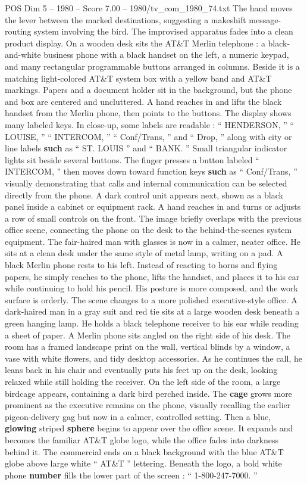 \begin{textsample}{POS Dim 5 – 1980 – Score 7.00 – 1980/tv\_com\_1980\_74.txt}
The hand moves the lever between the marked destinations, suggesting a makeshift message-routing system involving the bird.
The improvised apparatus fades into a clean product display.
On a wooden desk sits the AT\&T Merlin telephone : a black-and-white business phone with a black handset on the left, a numeric keypad, and many rectangular programmable buttons arranged in columns.
Beside it is a matching light-colored AT\&T system box with a yellow band and AT\&T markings.
Papers and a document holder sit in the background, but the phone and box are centered and uncluttered.
A hand reaches in and lifts the black handset from the Merlin phone, then points to the buttons.
The display shows many labeled keys.
In close-up, some labels are readable : “ HENDERSON, ” “ LOUISE, ” “ INTERCOM, ” “ Conf/Trans, ” and “ Drop, ” along with city or line labels \textbf{such} as “ ST.
LOUIS ” and “ BANK. ” Small triangular indicator lights sit beside several buttons.
The finger presses a button labeled “ INTERCOM, ” then moves down toward function keys \textbf{such} as “ Conf/Trans, ” visually demonstrating that calls and internal communication can be selected directly from the phone.
A dark control unit appears next, shown as a black panel inside a cabinet or equipment rack.
A hand reaches in and turns or adjusts a row of small controls on the front.
The image briefly overlaps with the previous office scene, connecting the phone on the desk to the behind-the-scenes system equipment.
The fair-haired man with glasses is now in a calmer, neater office.
He sits at a clean desk under the same style of metal lamp, writing on a pad.
A black Merlin phone rests to his left.
Instead of reacting to horns and flying papers, he simply reaches to the phone, lifts the handset, and places it to his ear while continuing to hold his pencil.
His posture is more composed, and the work surface is orderly.
The scene changes to a more polished executive-style office.
A dark-haired man in a gray suit and red tie sits at a large wooden desk beneath a green hanging lamp.
He holds a black telephone receiver to his ear while reading a sheet of paper.
A Merlin phone sits angled on the right side of his desk.
The room has a framed landscape print on the wall, vertical blinds by a window, a vase with white flowers, and tidy desktop accessories.
As he continues the call, he leans back in his chair and eventually puts his feet up on the desk, looking relaxed while still holding the receiver.
On the left side of the room, a large birdcage appears, containing a dark bird perched inside.
The \textbf{cage} grows more prominent as the executive remains on the phone, visually recalling the earlier pigeon-delivery gag but now in a calmer, controlled setting.
Then a blue, \textbf{glowing} striped \textbf{sphere} begins to appear over the office scene.
It expands and becomes the familiar AT\&T globe logo, while the office fades into darkness behind it.
The commercial ends on a black background with the blue AT\&T globe above large white “ AT\&T ” lettering.
Beneath the logo, a bold white phone \textbf{number} fills the lower part of the screen : “ 1-800-247-7000. ”

\end{textsample}
